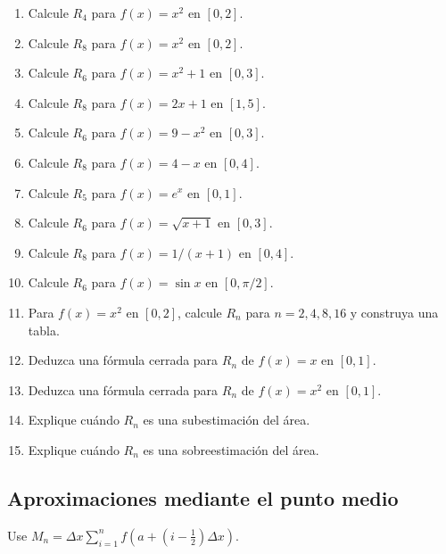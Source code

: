 \documentclass[12pt]{article}
\begin{document}
\begin{enumerate}[resume]
\item Calcule $R_4$ para $f(x)=x^2$ en $[0,2]$.
\item Calcule $R_8$ para $f(x)=x^2$ en $[0,2]$.
\item Calcule $R_6$ para $f(x)=x^2+1$ en $[0,3]$.
\item Calcule $R_8$ para $f(x)=2x+1$ en $[1,5]$.
\item Calcule $R_6$ para $f(x)=9-x^2$ en $[0,3]$.
\item Calcule $R_8$ para $f(x)=4-x$ en $[0,4]$.
\item Calcule $R_5$ para $f(x)=e^x$ en $[0,1]$.
\item Calcule $R_6$ para $f(x)=\sqrt{x+1}$ en $[0,3]$.
\item Calcule $R_8$ para $f(x)=1/(x+1)$ en $[0,4]$.
\item Calcule $R_6$ para $f(x)=\sin x$ en $[0,\pi/2]$.
\item Para $f(x)=x^2$ en $[0,2]$, calcule $R_n$ para $n=2,4,8,16$ y construya una tabla.
\item Deduzca una fórmula cerrada para $R_n$ de $f(x)=x$ en $[0,1]$.
\item Deduzca una fórmula cerrada para $R_n$ de $f(x)=x^2$ en $[0,1]$.
\item Explique cuándo $R_n$ es una subestimación del área.
\item Explique cuándo $R_n$ es una sobreestimación del área.
\end{enumerate}
\subsection{Aproximaciones mediante el punto medio}
Use $M_n=\Delta x\sum_{i=1}^{n}f\left(a+(i-\tfrac12)\Delta x\right)$.
\end{document}
